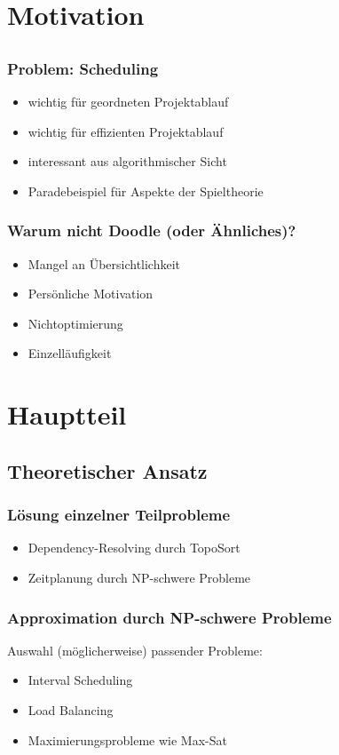 \documentclass[%
	handout,
	compressed
]{beamer}
\begin{document}
\section{Motivation}
	\subsection{}
		\begin{frame}
			\frametitle{Problem: Scheduling}
			\begin{itemize}
				\item wichtig für geordneten Projektablauf\pause
				\item wichtig für effizienten Projektablauf\pause
				\item interessant aus algorithmischer Sicht\pause
				\item Paradebeispiel für Aspekte der Spieltheorie
			\end{itemize}
		\end{frame}
		\begin{frame}
			\frametitle{Warum nicht Doodle (oder Ähnliches)?}
			\begin{itemize}
				\item Mangel an Übersichtlichkeit
				\item Persönliche Motivation
				\item Nichtoptimierung
				\item Einzelläufigkeit
			\end{itemize}
		\end{frame}
\section{Hauptteil}
	\subsection{Theoretischer Ansatz}	
		\begin{frame}
			\frametitle{Lösung einzelner Teilprobleme}
			\begin{itemize}
				\item Dependency-Resolving durch TopoSort
				\item Zeitplanung durch NP-schwere Probleme
			\end{itemize}
		\end{frame}
		\begin{frame}
				\frametitle{Approximation durch NP-schwere Probleme}
				Auswahl (möglicherweise) passender Probleme:
				\begin{itemize}
					\item Interval Scheduling
					\item Load Balancing
					\item Maximierungsprobleme wie Max-Sat
				\end{itemize}
		\end{frame}
\end{document}
